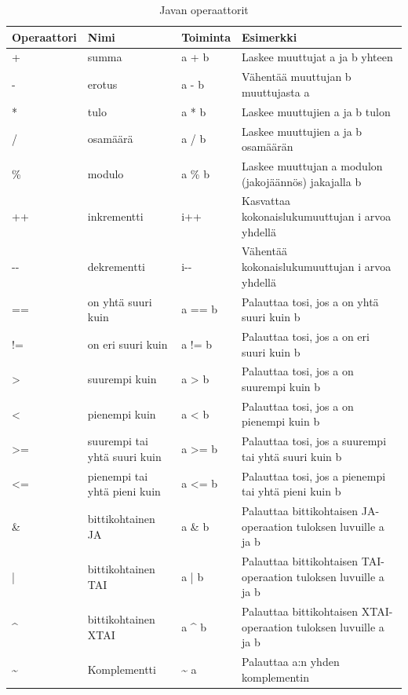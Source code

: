 \documentclass[openany]{book}
\begin{document}
\bigskip
\begin{table}
\begin{center}
\footnotesize
\begin{tabular}{llll}
\toprule
Operaattori & Nimi & Toiminta & Esimerkki \\
\midrule
+ & summa & a + b & Laskee muuttujat a ja b yhteen \\
\addlinespace
- & erotus & a - b & Vähentää muuttujan b muuttujasta a \\
\addlinespace
* & tulo & a * b & Laskee muuttujien a ja b tulon \\
\addlinespace
/ & osamäärä & a / b & Laskee muuttujien a ja b osamäärän \\
\addlinespace
\% & modulo & a \% b & Laskee muuttujan a modulon (jakojäännös) jakajalla b \\
\addlinespace
++ & inkrementti & i++ & Kasvattaa kokonaislukumuuttujan i arvoa yhdellä \\
\addlinespace
-{}- & dekrementti & i-{}- & Vähentää kokonaislukumuuttujan i arvoa yhdellä \\
\addlinespace
== & on yhtä suuri kuin & a == b & Palauttaa tosi, jos a on yhtä suuri kuin b \\
\addlinespace
!= & on eri suuri kuin & a != b & Palauttaa tosi, jos a on eri suuri kuin b \\
\addlinespace
> & suurempi kuin & a > b & Palauttaa tosi, jos a on suurempi kuin b \\
\addlinespace
< & pienempi kuin & a < b & Palauttaa tosi, jos a on pienempi kuin b \\
\addlinespace
>= & suurempi tai yhtä suuri kuin & a >= b & Palauttaa tosi, jos a suurempi tai yhtä
suuri kuin b \\
<= & pienempi tai yhtä pieni kuin & a <= b & Palauttaa tosi, jos a pienempi tai yhtä
pieni kuin b \\
\addlinespace
\& & bittikohtainen JA & a \& b & Palauttaa bittikohtaisen JA-operaation tuloksen luvuille a ja b
\\
\addlinespace
| & bittikohtainen TAI & a | b & Palauttaa bittikohtaisen TAI-operaation tuloksen luvuille a ja b
\\
\addlinespace
\^{} & bittikohtainen XTAI & a \^{} b & Palauttaa bittikohtaisen XTAI-operaation tuloksen luvuille
a ja b \\
\addlinespace
\~{} & Komplementti & \~{} a & Palauttaa a:n yhden komplementin \\
\bottomrule
\end{tabular}
\end{center}
\caption{Javan operaattorit}
\label{operators}
\end{table}
\end{document}
